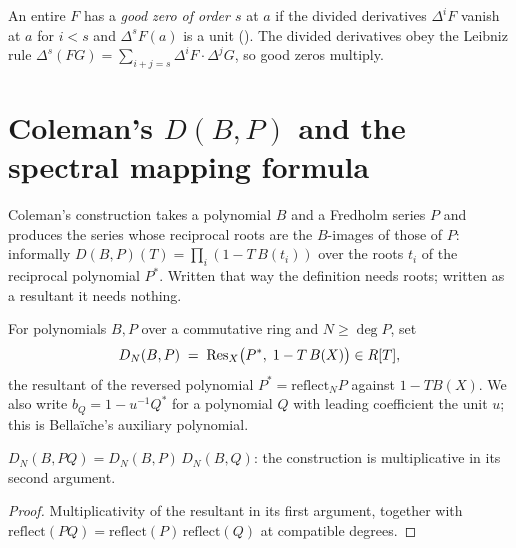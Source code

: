 \begin{definition}
  \label{def:isgoodzero}
  \leanok
  An entire $F$ has a \emph{good zero of order $s$} at $a$ if the divided derivatives
  $\Delta^{i}F$ vanish at $a$ for $i < s$ and $\Delta^{s}F(a)$ is a unit
  (\cite[Definition II.2.11]{Bellaiche}).  The divided derivatives obey the Leibniz rule
  $\Delta^{s}(FG) = \sum_{i+j=s}\Delta^{i}F\cdot\Delta^{j}G$, so good zeros multiply.
\end{definition}

\section{Coleman's $D(B,P)$ and the spectral mapping formula}

Coleman's construction \cite[\S A3--A4]{Coleman} takes a polynomial $B$ and a Fredholm series
$P$ and produces the series whose reciprocal roots are the $B$-images of those of $P$:
informally $D(B,P)(T) = \prod_i (1 - T\,B(t_i))$ over the roots $t_i$ of the reciprocal
polynomial $P^{*}$.  Written that way the definition needs roots; written as a resultant it
needs nothing.

\begin{definition}
  \label{def:dpoly}
  \leanok
  For polynomials $B, P$ over a commutative ring and $N \geq \deg P$, set
  \[
    D_N(B,P) \;=\; \operatorname{Res}_X\bigl(P^{*}, \; 1 - T\,B(X)\bigr) \in R[T],
  \]
  the resultant of the reversed polynomial $P^{*} = \mathrm{reflect}_N P$ against
  $1 - T B(X)$.  We also write $b_Q = 1 - u^{-1}Q^{*}$ for a polynomial $Q$ with leading
  coefficient the unit $u$; this is Bella\"iche's auxiliary polynomial.
\end{definition}

\begin{lemma}
  \label{lem:dpoly-mul}
  \leanok
  $D_N(B, PQ) = D_N(B,P)\,D_N(B,Q)$: the construction is multiplicative in its second argument.
\end{lemma}

\begin{proof}
  \leanok
  Multiplicativity of the resultant in its first argument, together with
  $\mathrm{reflect}(PQ) = \mathrm{reflect}(P)\,\mathrm{reflect}(Q)$ at compatible degrees.
\end{proof}

